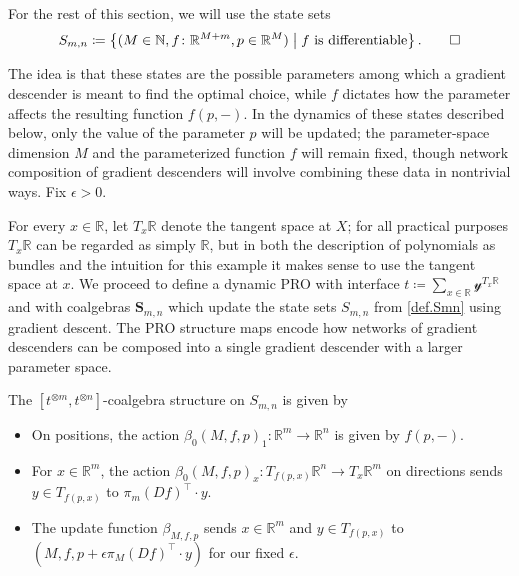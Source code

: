 \documentclass[11pt, one side, article]{memoir}
\theoremstyle{definition}
\theoremstyle{plain}
\newenvironment{definition}
  {\pushQED{\qed}\renewcommand{\qedsymbol}{$\lozenge$}\definitionx}
  {\popQED\enddefinitionx}
\newcommand{\Cat}[1]{\mathbf{#1}}%
\newcommand{\nn}{\mathbb{N}}
\newcommand{\rr}{\mathbb{R}}
\newcommand{\yon}{\mathcal{y}}
\newcommand{\0}{\textsf{0}}
\newcommand{\1}{\tn{\textsf{1}}}
\renewcommand{\S}{{\Cat{S}}}
\begin{document}
\begin{definition}\label{def.Smn}
For the rest of this section, we will use the state sets 
\[
S_{m,n} \coloneqq \left\{(M \in \nn, f\colon \rr^{M+m}, p \in \rr^M) \;\middle|\; f \textrm{ is differentiable}\right\}.
\qedhere
\]
\end{definition}

The idea is that these states are the possible parameters among which a gradient descender is meant to find the optimal choice, while $f$ dictates how the parameter affects the resulting function $f(p,-)$. In the dynamics of these states described below, only the value of the parameter $p$ will be updated; the parameter-space dimension $M$ and the parameterized function $f$ will remain fixed, though network composition of gradient descenders will involve combining these data in nontrivial ways. Fix $\epsilon>0$.%

For every $x\in\rr$, let $T_x\rr$ denote the tangent space at $X$; for all practical purposes $T_x \rr$ can be regarded as simply $\rr$, but in both the description of polynomials as bundles and the intuition for this example it makes sense to use the tangent space at $x$. We proceed to define a dynamic PRO with interface $t \coloneqq \sum_{x \in \rr} \yon^{T_x \rr}$ and with  coalgebras $\S_{m,n}$ which update the state sets $S_{m,n}$ from \cref{def.Smn} using gradient descent. The PRO structure maps encode how networks of gradient descenders can be composed into a single gradient descender with a larger parameter space.

\begin{definition}
The $[t^{\otimes m},t^{\otimes n}]$-coalgebra structure on $S_{m,n}$ is given by 
\begin{itemize}
	\item On positions, the action $\beta_0(M,f,p)_1\colon \rr^m \to \rr^n$ is given by $f(p,-)$.
	\item For $x \in \rr^m$, the action $\beta_0(M,f,p)_x\colon T_{f(p,x)} \rr^n \to T_x \rr^m$ on directions sends $y\in T_{f(p,x)}$ to $\pi_m (Df)^\top \cdot y$.
	\item The update function $\beta_{M,f,p}$ sends $x \in \rr^m$ and $y \in T_{f(p,x)}$ to $(M,f,p+\epsilon \pi_M (Df)^\top \cdot y)$ for our fixed $\epsilon$.
	\qedhere
\end{itemize}
\end{definition}
\end{document}
